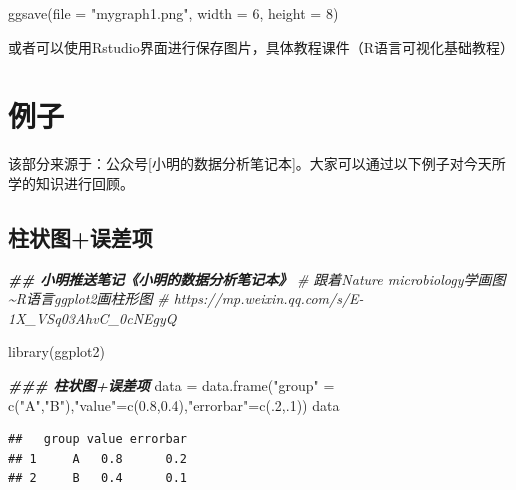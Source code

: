 \documentclass[
]{book}
\newenvironment{Shaded}{\begin{snugshade}}{\end{snugshade}}
\newcommand{\AttributeTok}[1]{\textcolor[rgb]{0.77,0.63,0.00}{#1}}
\newcommand{\CommentTok}[1]{\textcolor[rgb]{0.56,0.35,0.01}{\textit{#1}}}
\newcommand{\DecValTok}[1]{\textcolor[rgb]{0.00,0.00,0.81}{#1}}
\newcommand{\DocumentationTok}[1]{\textcolor[rgb]{0.56,0.35,0.01}{\textbf{\textit{#1}}}}
\newcommand{\FloatTok}[1]{\textcolor[rgb]{0.00,0.00,0.81}{#1}}
\newcommand{\FunctionTok}[1]{\textcolor[rgb]{0.00,0.00,0.00}{#1}}
\newcommand{\NormalTok}[1]{#1}
\newcommand{\OtherTok}[1]{\textcolor[rgb]{0.56,0.35,0.01}{#1}}
\newcommand{\StringTok}[1]{\textcolor[rgb]{0.31,0.60,0.02}{#1}}
\begin{document}
\begin{Shaded}
\begin{Highlighting}[]
\FunctionTok{ggsave}\NormalTok{(}\AttributeTok{file =} \StringTok{"mygraph1.png"}\NormalTok{, }\AttributeTok{width =} \DecValTok{6}\NormalTok{, }\AttributeTok{height =} \DecValTok{8}\NormalTok{)}
\end{Highlighting}
\end{Shaded}

或者可以使用Rstudio界面进行保存图片，具体教程课件（R语言可视化基础教程）

\hypertarget{ux4f8bux5b50}{%
\section{例子}\label{ux4f8bux5b50}}

该部分来源于：公众号{[}小明的数据分析笔记本{]}。大家可以通过以下例子对今天所学的知识进行回顾。

\hypertarget{ux67f1ux72b6ux56feux8befux5deeux9879}{%
\subsection{柱状图+误差项}\label{ux67f1ux72b6ux56feux8befux5deeux9879}}

\begin{Shaded}
\begin{Highlighting}[]
\DocumentationTok{\#\# 小明推送笔记《小明的数据分析笔记本》}
\CommentTok{\# 跟着Nature microbiology学画图\textasciitilde{}R语言ggplot2画柱形图 }
\CommentTok{\# https://mp.weixin.qq.com/s/E{-}1X\_VSq03AhvC\_0cNEgyQ}

\FunctionTok{library}\NormalTok{(ggplot2)}

\DocumentationTok{\#\#\# 柱状图+误差项}
\NormalTok{data }\OtherTok{=} \FunctionTok{data.frame}\NormalTok{(}\StringTok{"group"} \OtherTok{=} \FunctionTok{c}\NormalTok{(}\StringTok{"A"}\NormalTok{,}\StringTok{"B"}\NormalTok{),}\StringTok{"value"}\OtherTok{=}\FunctionTok{c}\NormalTok{(}\FloatTok{0.8}\NormalTok{,}\FloatTok{0.4}\NormalTok{),}\StringTok{"errorbar"}\OtherTok{=}\FunctionTok{c}\NormalTok{(.}\DecValTok{2}\NormalTok{,.}\DecValTok{1}\NormalTok{))}
\NormalTok{data}
\end{Highlighting}
\end{Shaded}

\begin{verbatim}
##   group value errorbar
## 1     A   0.8      0.2
## 2     B   0.4      0.1
\end{verbatim}
\end{document}
